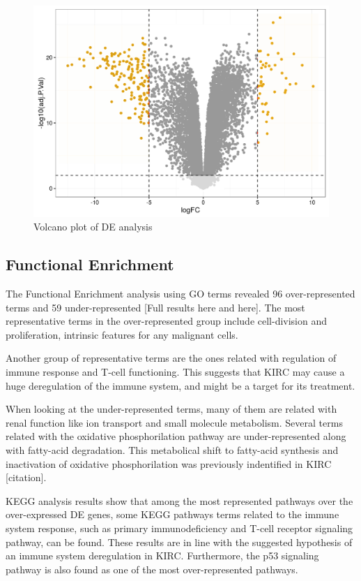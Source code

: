 \documentclass[9pt,twocolumn,twoside]{gsajnl}
\begin{document}
\begin{figure}[htbp]
\centering
\includegraphics[width=\linewidth]{figures/fig1_volcano.png}
\caption{Volcano plot of DE analysis }%
\label{fig:spectrum}
\end{figure}

\subsection*{Functional Enrichment}
The Functional Enrichment analysis using GO terms revealed 96 over-represented terms and 59 under-represented [Full results here and here]. The most representative terms in the over-represented group include cell-division and proliferation, intrinsic features for any malignant cells. 

Another group of representative terms are the ones related with regulation of immune response and T-cell functioning. This suggests that KIRC may cause a huge deregulation of the immune system, and might be a target for its treatment. 

When looking at the under-represented terms, many of them are related with renal function like ion transport and small molecule metabolism. Several terms related with the oxidative phosphorilation pathway are under-represented along with fatty-acid degradation. This metabolical shift to fatty-acid synthesis and inactivation of oxidative phosphorilation was previously indentified in KIRC [citation].

KEGG analysis results show that among the most represented pathways over the over-expressed DE genes, some KEGG pathways terms related to the immune system response, such as primary immunodeficiency and T-cell receptor signaling pathway, can be found.  These results are in line with the suggested hypothesis of an immune system deregulation in KIRC. Furthermore, the p53 signaling pathway is also found as one of the most over-represented pathways.
\end{document}
